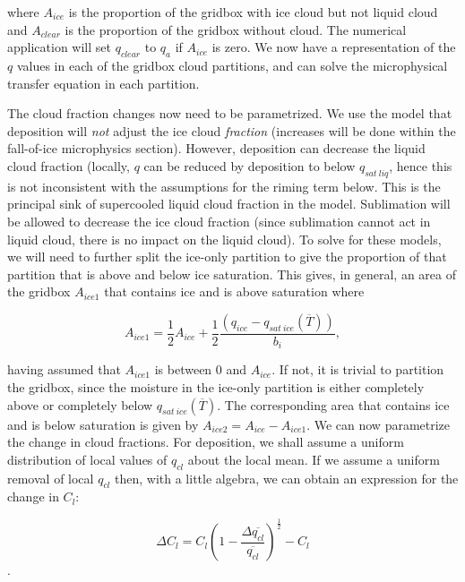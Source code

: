 \documentclass{UMDP_article}
\begin{document}
where $A_{ice}$ is the proportion of the gridbox with ice cloud but not
liquid cloud and $A_{clear}$ is the proportion of the gridbox without cloud.
The numerical application will set $q_{clear}$ to $q_a$ if $A_{ice}$
is zero. We now have a representation of the $q$ values in each of the
gridbox cloud partitions, and can solve the microphysical transfer equation
in each partition.

The cloud fraction changes now need to be parametrized. We use the
model that deposition will \textit{not} adjust the ice cloud
\textit{fraction} (increases will be done within the fall-of-ice microphysics
section). However, deposition can
decrease the liquid cloud fraction (locally, $q$ can be reduced by
deposition to below $q_{sat~liq}$, hence this is not inconsistent with
the assumptions for the riming term below. This is the principal sink
of supercooled liquid cloud fraction in the model. Sublimation will
be allowed to decrease the ice cloud fraction (since sublimation cannot
act in liquid cloud, there is no impact on the liquid cloud). To solve
for these models, we will need to further split the ice-only partition
to give the proportion of that partition that is above and below ice
saturation. This gives, in general, an area of the gridbox $A_{ice1}$
that contains ice and is above saturation where

\begin{equation}
 A_{ice1} = \frac{1}{2} A_{ice} + \frac{1}{2} 
 \frac{ (q_{ice}-q_{sat~ice}(\overline{T})) }  {b_i},
\label{eq:q_ice_above_sat}
\end{equation}

having assumed that $A_{ice1}$ is between 0 and $A_{ice}$.
If not, it is trivial to partition the gridbox, since the moisture in the ice-only
partition is either completely above or completely below $q_{sat~ice}(\overline{T})$.
The corresponding
area that contains ice and is below saturation is given by
$A_{ice2} = A_{ice} - A_{ice1}$.
We can now parametrize the change in cloud fractions. For deposition,
we shall assume a uniform distribution of local values of $q_{cl}$ about
the local mean. If we assume a uniform removal of local $q_{cl}$ then, with
a little algebra, we can obtain an expression for the change in $C_l$:

\begin{equation}
\Delta C_l = C_l ( 1 - \frac {\Delta \overline{q_{cl}}} {\overline{q_{cl}}} )
^{\frac{1}{2}} - C_l 
\label{eq:deltacfl_dep}
\end{equation}.
\end{document}
